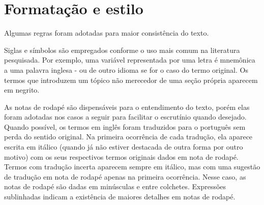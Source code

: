 \chapter{Formatação e estilo}\label{estilo}
Algumas regras foram adotadas para maior consistência do texto.

Siglas e símbolos são empregados conforme o uso mais comum na literatura pesquisada.
Por exemplo, uma variável representada por uma letra é mnemônica a uma palavra inglesa - ou de outro idioma se for o caso do termo original.
Os termos que introduzem um tópico não merecedor de uma seção própria aparecem em negrito.

As notas de rodapé são dispensáveis para o entendimento do texto, porém elas foram adotadas nos casos a seguir para facilitar o escrutínio quando desejado.
Quando possível, os termos em inglês foram traduzidos para o português sem perda do sentido original.
Na primeira ocorrência de cada tradução, ela aparece escrita em itálico (quando já não estiver destacada de outra forma por outro motivo) com os seus respectivos termos originais dados em nota de rodapé.
Termos com tradução incerta aparecem sempre em itálico, mas com uma sugestão de tradução em nota de rodapé apenas na primeira ocorrência.
Nesse caso, as notas de rodapé são dadas em minúsculas e entre colchetes.
Expressões sublinhadas indicam a existência de maiores detalhes em notas de rodapé.
%
